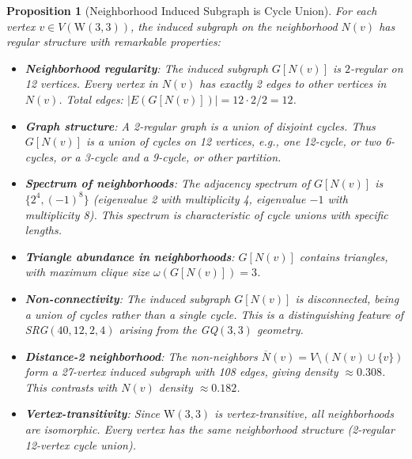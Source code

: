 \documentclass[12pt,a4paper]{article}
\newtheorem{proposition}[theorem]{Proposition}
\newcommand{\W}{\mathrm{W}(3,3)}
\begin{document}
\begin{proposition}[Neighborhood Induced Subgraph is Cycle Union]\label{prop:neighborhoods}
For each vertex $v \in V(\W)$, the induced subgraph on the neighborhood $N(v)$ has
regular structure with remarkable properties:
\begin{itemize}
  \item \textbf{Neighborhood regularity}: The induced subgraph $G[N(v)]$ is $2$-regular on 12 vertices.
        Every vertex in $N(v)$ has exactly 2 edges to other vertices in $N(v)$.
        Total edges: $|E(G[N(v)])| = 12 \cdot 2 / 2 = 12$.
  \item \textbf{Graph structure}: A 2-regular graph is a union of disjoint cycles.
        Thus $G[N(v)]$ is a union of cycles on 12 vertices, e.g., one 12-cycle, or
        two 6-cycles, or a 3-cycle and a 9-cycle, or other partition.
  \item \textbf{Spectrum of neighborhoods}: The adjacency spectrum of $G[N(v)]$ is
        $\{2^4, (-1)^8\}$ (eigenvalue 2 with multiplicity 4, eigenvalue $-1$ with multiplicity 8).
        This spectrum is characteristic of cycle unions with specific lengths.
  \item \textbf{Triangle abundance in neighborhoods}: $G[N(v)]$ contains triangles, with
        maximum clique size $\omega(G[N(v)]) = 3$.
  \item \textbf{Non-connectivity}: The induced subgraph $G[N(v)]$ is \emph{disconnected},
        being a union of cycles rather than a single cycle. This is a distinguishing feature
        of SRG$(40,12,2,4)$ arising from the GQ$(3,3)$ geometry.
  \item \textbf{Distance-2 neighborhood}: The non-neighbors $\overline{N}(v) = V \setminus (N(v) \cup \{v\})$
        form a 27-vertex induced subgraph with 108 edges, giving density $\approx 0.308$.
        This contrasts with $N(v)$ density $\approx 0.182$.
  \item \textbf{Vertex-transitivity}: Since $\W$ is vertex-transitive, all neighborhoods are
        isomorphic. Every vertex has the same neighborhood structure (2-regular 12-vertex cycle union).
\end{itemize}
\end{proposition}
\end{document}
